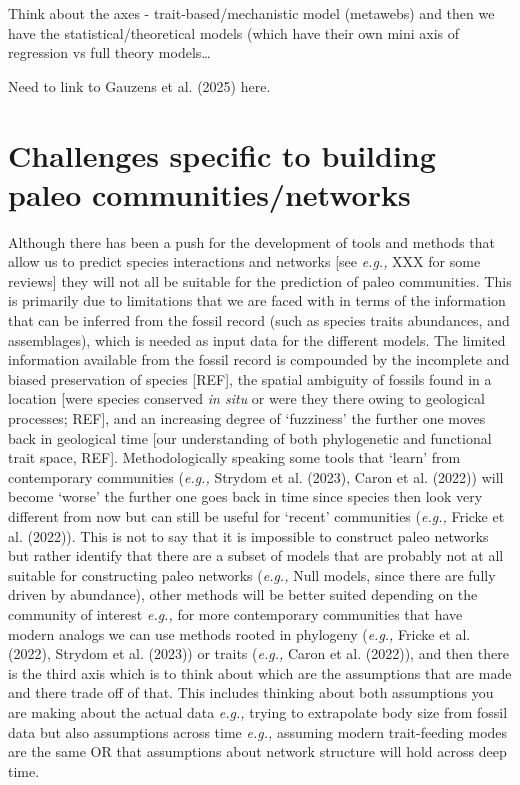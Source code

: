 \documentclass[
]{article}
\begin{document}
Think about the axes - trait-based/mechanistic model (metawebs) and then
we have the statistical/theoretical models (which have their own mini
axis of regression vs full theory models\ldots{}

Need to link to Gauzens et al. (2025) here.

\section{Challenges specific to building paleo
communities/networks}\label{challenges-specific-to-building-paleo-communitiesnetworks}

Although there has been a push for the development of tools and methods
that allow us to predict species interactions and networks {[}see
\emph{e.g.,} XXX for some reviews{]} they will not all be suitable for
the prediction of paleo communities. This is primarily due to
limitations that we are faced with in terms of the information that can
be inferred from the fossil record (such as species traits abundances,
and assemblages), which is needed as input data for the different
models. The limited information available from the fossil record is
compounded by the incomplete and biased preservation of species
{[}REF{]}, the spatial ambiguity of fossils found in a location {[}were
species conserved \emph{in situ} or were they there owing to geological
processes; REF{]}, and an increasing degree of `fuzziness' the further
one moves back in geological time {[}our understanding of both
phylogenetic and functional trait space, REF{]}. Methodologically
speaking some tools that `learn' from contemporary communities
(\emph{e.g.,} Strydom et al. (2023), Caron et al. (2022)) will become
`worse' the further one goes back in time since species then look very
different from now but can still be useful for `recent' communities
(\emph{e.g.,} Fricke et al. (2022)). This is not to say that it is
impossible to construct paleo networks but rather identify that there
are a subset of models that are probably not at all suitable for
constructing paleo networks (\emph{e.g.,} Null models, since there are
fully driven by abundance), other methods will be better suited
depending on the community of interest \emph{e.g.,} for more
contemporary communities that have modern analogs we can use methods
rooted in phylogeny (\emph{e.g.,} Fricke et al. (2022), Strydom et al.
(2023)) or traits (\emph{e.g.,} Caron et al. (2022)), and then there is
the third axis which is to think about which are the assumptions that
are made and there trade off of that. This includes thinking about both
assumptions you are making about the actual data \emph{e.g.,} trying to
extrapolate body size from fossil data but also assumptions across time
\emph{e.g.,} assuming modern trait-feeding modes are the same OR that
assumptions about network structure will hold across deep time.
\end{document}
